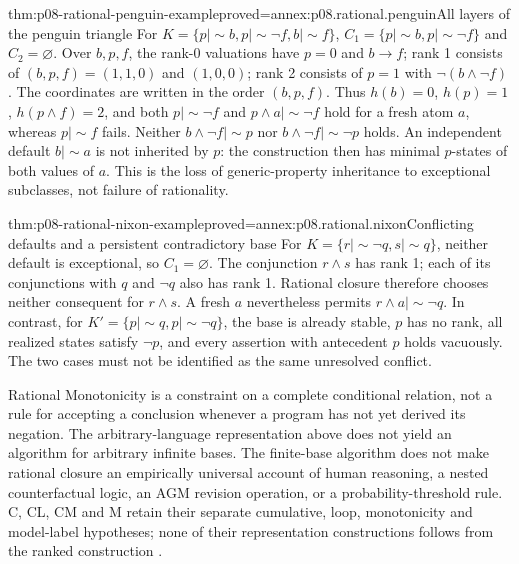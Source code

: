 \begin{hbtheorem}{thm:p08-rational-penguin-example}{proved=annex:p08.rational.penguin}{All layers of the penguin triangle}
For \(K=\{p\mathrel{|\!\sim}b,
p\mathrel{|\!\sim}\neg f,b\mathrel{|\!\sim}f\}\),
\(C_1=\{p\mathrel{|\!\sim}b,p\mathrel{|\!\sim}\neg f\}\)
and \(C_2=\varnothing\).
Over \(b,p,f\), the rank-0 valuations have \(p=0\) and
\(b\to f\); rank 1 consists of \((b,p,f)=(1,1,0)\) and
\((1,0,0)\); rank 2 consists of \(p=1\) with
\(\neg(b\wedge\neg f)\). The coordinates are written in
the order \((b,p,f)\).
Thus \(h(b)=0\), \(h(p)=1\),
\(h(p\wedge f)=2\), and both \(p\mathrel{|\!\sim}\neg f\)
and \(p\wedge a\mathrel{|\!\sim}\neg f\) hold for a fresh
atom \(a\), whereas \(p\mathrel{|\!\sim}f\) fails.
Neither \(b\wedge\neg f\mathrel{|\!\sim}p\) nor
\(b\wedge\neg f\mathrel{|\!\sim}\neg p\) holds.
An independent default \(b\mathrel{|\!\sim}a\) is not inherited
by \(p\): the construction then has minimal \(p\)-states of
both values of \(a\). This is the loss of generic-property
inheritance to exceptional subclasses, not failure of rationality.
\end{hbtheorem}

\begin{hbtheorem}{thm:p08-rational-nixon-example}{proved=annex:p08.rational.nixon}{Conflicting defaults and a persistent contradictory base}
For \(K=\{r\mathrel{|\!\sim}\neg q,
s\mathrel{|\!\sim}q\}\), neither default is exceptional,
so \(C_1=\varnothing\). The conjunction \(r\wedge s\)
has rank 1; each of its conjunctions with \(q\) and \(\neg q\)
also has rank 1. Rational closure therefore chooses neither consequent
for \(r\wedge s\). A fresh \(a\) nevertheless permits
\(r\wedge a\mathrel{|\!\sim}\neg q\).
In contrast, for \(K'=\{p\mathrel{|\!\sim}q,
p\mathrel{|\!\sim}\neg q\}\), the base is already stable,
\(p\) has no rank, all realized states satisfy \(\neg p\),
and every assertion with antecedent \(p\) holds vacuously.
The two cases must not be identified as the same unresolved conflict.
\end{hbtheorem}

Rational Monotonicity is a constraint on a complete conditional relation,
not a rule for accepting a conclusion whenever a program has not yet
derived its negation. The arbitrary-language representation above does
not yield an algorithm for arbitrary infinite bases. The finite-base
algorithm does not make rational closure an empirically universal account
of human reasoning, a nested counterfactual logic, an AGM revision
operation, or a probability-threshold rule. C, CL, CM and M retain their
separate cumulative, loop, monotonicity and model-label hypotheses;
none of their representation constructions follows from the ranked
construction \cite{KrausLehmannMagidor2002Author,LehmannMagidor2002Author}.
